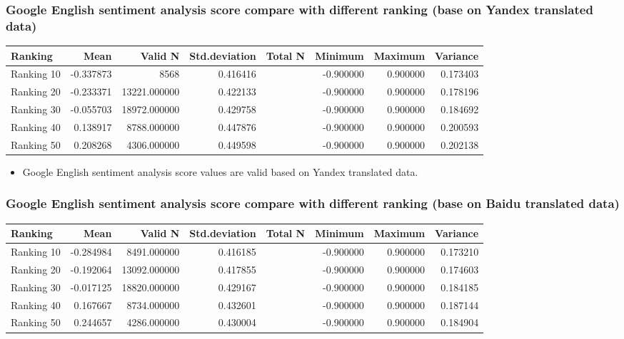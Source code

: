 \subsubsection{Google English sentiment analysis score compare with different ranking (base on Yandex translated data)}
\label{sec:org946cd8b}
\begin{center}
\begin{tabular}{lrrrlrrr}
Ranking & Mean & Valid N & Std.deviation & Total N & Minimum & Maximum & Variance\\
\hline
Ranking 10 & -0.337873 & 8568 & 0.416416 &  & -0.900000 & 0.900000 & 0.173403\\
Ranking 20 & -0.233371 & 13221.000000 & 0.422133 &  & -0.900000 & 0.900000 & 0.178196\\
Ranking 30 & -0.055703 & 18972.000000 & 0.429758 &  & -0.900000 & 0.900000 & 0.184692\\
Ranking 40 & 0.138917 & 8788.000000 & 0.447876 &  & -0.900000 & 0.900000 & 0.200593\\
Ranking 50 & 0.208268 & 4306.000000 & 0.449598 &  & -0.900000 & 0.900000 & 0.202138\\
\end{tabular}
\end{center}

\begin{itemize}
\item Google English sentiment analysis score values are valid based on Yandex translated data.
\end{itemize}
\subsubsection{Google English sentiment analysis score compare with different ranking (base on Baidu translated data)}
\label{sec:org32a8312}
\begin{center}
\begin{tabular}{lrrrlrrr}
Ranking & Mean & Valid N & Std.deviation & Total N & Minimum & Maximum & Variance\\
\hline
Ranking 10 & -0.284984 & 8491.000000 & 0.416185 &  & -0.900000 & 0.900000 & 0.173210\\
Ranking 20 & -0.192064 & 13092.000000 & 0.417855 &  & -0.900000 & 0.900000 & 0.174603\\
Ranking 30 & -0.017125 & 18820.000000 & 0.429167 &  & -0.900000 & 0.900000 & 0.184185\\
Ranking 40 & 0.167667 & 8734.000000 & 0.432601 &  & -0.900000 & 0.900000 & 0.187144\\
Ranking 50 & 0.244657 & 4286.000000 & 0.430004 &  & -0.900000 & 0.900000 & 0.184904\\
\end{tabular}
\end{center}

